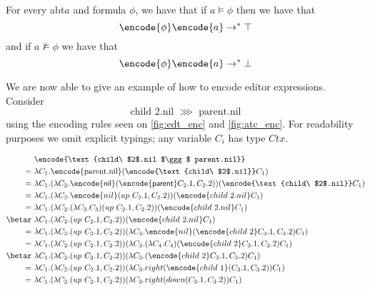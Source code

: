 \documentclass[sigplan,review]{acmart}
\newcommand{\abt}{\textsf{abt}\xspace}
\newcommand{\ec}[1]{\ensuremath{\textsf{#1}}\xspace}
\newcommand{\parnt}{\ec{parent}}
\newcommand{\nil}{\ec{nil}}
\begin{document}
\begin{lemma}
  For every \abt $a$ and formula $\phi$, we have that if $a \models
  \phi$ then we have that
  \begin{equation}
    \label{eq:true}
    \encode{\phi} \encode{a} \rightarrow^{*} \top
  \end{equation}
  and if $a \not\models \phi$ we have that
  \begin{equation}
    \label{eq:false}
        \encode{\phi} \encode{a} \rightarrow^{*} \bot
  \end{equation}
\end{lemma}

\begin{example}
    We are now able to give an example of how to encode editor
    expressions. Consider
    \begin{equation*}
        \text{child\ $2$.nil $\ggg$ parent.nil}
    \end{equation*}
    using the encoding rules seen on \cref{fig:edt_enc} and
    \cref{fig:atc_enc}. For readability purposes we omit explicit
    typings;  any variable $C_i$ has type $Ctx$.
    \begin{small}
    \begin{align*}
         &\ \encode{\text{child\ $2$.nil $\ggg$ parent.nil}} \\
         =&\ \lambda C_1 . \encode{\text{parent.nil}} (\encode{\text{child\ $2$.nil}} C_1) \\
         =&\ \lambda C_1 . (\lambda C_2 . \encode{\nil }(\encode{\parnt} C_2.1, C_2.2)) (\encode{\text{child\ $2$.nil}} C_1) \\
         =&\ \lambda C_1 . (\lambda C_2 . \encode{nil}(up\ C_2.1, C_2.2)) (\encode{child\ 2.nil} C_1) \\
         =&\ \lambda C_1 . (\lambda C_2 . (\lambda C_3 . C_3)(up\ C_2.1, C_2.2)) (\encode{child\ 2.nil} C_1) \\
         \betar&\ \lambda C_1 . (\lambda C_2 . (up\ C_2.1, C_2.2)) (\encode{child\ 2.nil} C_1) \\
         =&\ \lambda C_1 . (\lambda C_2 . (up\ C_2.1, C_2.2)) (\lambda C_3 . \encode{nil} (\encode{child\ 2} C_3.1, C_3.2)C_1) \\
         =&\ \lambda C_1 . (\lambda C_2 . (up\ C_2.1, C_2.2)) (\lambda C_3 . (\lambda C_4.C_4) (\encode{child\ 2} C_3.1, C_3.2)C_1) \\
         \betar&\ \lambda C_1 . (\lambda C_2 . (up\ C_2.1, C_2.2)) (\lambda C_3 . (\encode{child\ 2} C_3.1, C_3.2)C_1) \\
         =&\ \lambda C_1 . (\lambda C_2 . (up\ C_2.1, C_2.2)) (\lambda C_3 . right (\encode{child\ 1} (C_3.1, C_3.2))C_1) \\
         =&\ \lambda C_1 . (\lambda C_2 . (up\ C_2.1, C_2.2)) (\lambda C_3 . right (down (C_3.1, C_3.2))C_1) \\
    \end{align*}
    \end{small}
\end{example}
\end{document}
